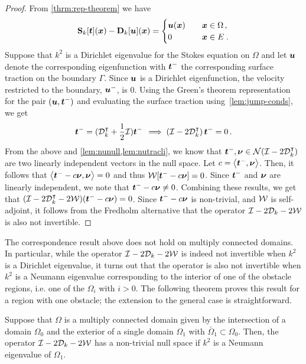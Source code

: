 \begin{proof}
From \cref{thrm:rep-theorem} we have 
  \begin{equation} 
    {\bf S}_{k} [{\boldsymbol t}]({\boldsymbol x}) - {\bf D}_{k}[{\boldsymbol u}]({\boldsymbol x}) = \begin{cases} 
    {\boldsymbol u}({\boldsymbol x}) &\quad {\boldsymbol x} \in \Omega \, , \\
    0 &\quad {\boldsymbol x} \in E \; .
    \end{cases}
  \end{equation}
  Suppose that $k^2$ is a Dirichlet eigenvalue for the Stokes equation
  on $\Omega$ and let ${\boldsymbol u}$ denote the corresponding eigenfunction
  with ${\boldsymbol t}^{-}$ the corresponding surface traction on the
  boundary $\Gamma$.
  Since ${\boldsymbol u}$ is a Dirichlet eigenfunction, the velocity restricted
  to the boundary, ${\boldsymbol u}^{-}$, is $0$. 
  Using the Green's theorem representation for the pair
  $({\boldsymbol u},{\boldsymbol t}^{-})$ and evaluating the surface traction
  using~\cref{lem:jump-conds}, we get
  \begin{equation}
    {\boldsymbol t}^{-} = ({\mathcal D}^{\intercal}_{k} + \frac{1}{2} \mathcal I) {\boldsymbol t}^{-} \,
    \implies \left(\mathcal I - 2{\mathcal D}^{\intercal}_{k} \right) 
    {\boldsymbol t}^{-} = 0 \, .
  \end{equation}
  From the above and \cref{lem:nunull,lem:nutracli},
  we know that ${\boldsymbol t}^{-}, {\boldsymbol \nu} \in {\mathcal N}(\mathcal I - 2{\mathcal D}^{\intercal}_{k})$
  are two linearly independent vectors in the null space.
  Let $c = \left< {\boldsymbol t}^{-},{\boldsymbol \nu} \right>$. Then, it
  follows that $\left<{\boldsymbol t}^{-} -c {\boldsymbol \nu}, {\boldsymbol \nu} \right> = 0$
  and thus ${\mathcal W}[{\boldsymbol t}^{-} - c{\boldsymbol \nu}] = 0$. 
  Since ${\boldsymbol t}^{-}$ and ${\boldsymbol \nu}$ are linearly independent, we note that
  ${\boldsymbol t}^{-} -c{\boldsymbol \nu} \neq 0$. Combining these results, we get that
  $(\mathcal I - 2{\mathcal D}^{\intercal}_{k} - 2{\mathcal W}) ({\boldsymbol t}^{-} - c{\boldsymbol \nu}) = 0$. 
  Since ${\boldsymbol t}^{-}-c{\boldsymbol \nu}$ is non-trivial, and ${\mathcal W}$ is
  self-adjoint, it follows from the Fredholm alternative
  that the operator $\mathcal I - 2{\mathcal D}_{k} - 2{\mathcal W}$ is also not
  invertible.
\end{proof}

The correspondence result above does not hold on multiply
connected domains.
In particular, while the operator $\mathcal I -2{\mathcal D}_{k} -2{\mathcal W}$ 
is indeed not invertible when $k^2$ is a Dirichlet eigenvalue,
it turns out that the operator is also not
invertible when $k^2$ is a Neumann eigenvalue
corresponding to the interior of one of the obstacle regions,
i.e. one of the $\Omega_{i}$ with $i > 0$. The following theorem
proves this result for a region with one obstacle;
the extension to the general case is straightforward.

\begin{thrm}
  Suppose that $\Omega$ is a multiply connected domain
  given by the intersection of a domain $\Omega_{0}$
  and the exterior of a single domain $\Omega_{1}$ with
  $ \bar\Omega_1 \subset \Omega_0$.
  Then, the operator $\mathcal I - 2{\mathcal D}_{k} - 2{\mathcal W}$ has a non-trivial
  null space if $k^2$ is a Neumann eigenvalue of $\Omega_{1}$.
\end{thrm}

